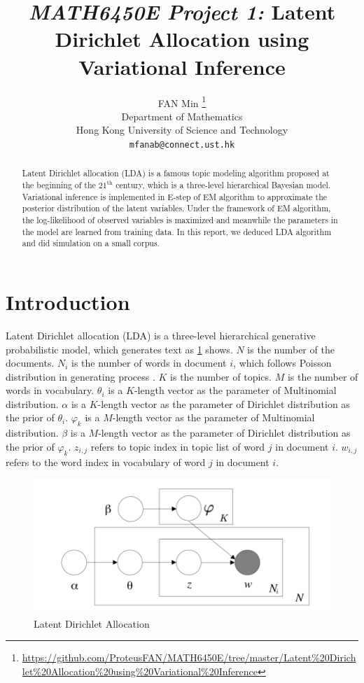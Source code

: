 \documentclass{article}
\title{\emph{MATH6450E Project 1:} Latent Dirichlet Allocation using Variational Inference}
\author{%
  FAN Min
  \thanks{\url{https://github.com/ProteusFAN/MATH6450E/tree/master/Latent\%20Dirichlet\%20Allocation\%20using\%20Variational\%20Inference}} \\
  Department of Mathematics\\
  Hong Kong University of Science and Technology\\
  \texttt{mfanab@connect.ust.hk} \\
}
\begin{document}

\maketitle

\begin{abstract}
   Latent Dirichlet allocation (LDA) is a famous topic modeling algorithm proposed at the beginning of the $ 21^{\mathrm{th}} $ century, which is a three-level hierarchical Bayesian model. Variational inference is implemented in E-step of EM algorithm to approximate the posterior distribution of the latent variables. Under the framework of EM algorithm, the log-likelihood of observed variables is maximized and meanwhile the parameters in the model are learned from training data. In this report, we deduced LDA algorithm and did simulation on a small corpus. 
\end{abstract}

\section{Introduction}

Latent Dirichlet allocation (LDA) is a three-level hierarchical generative probabilistic model, which generates text as \ref{figure_lda} shows. $ N $ is the number of the documents. $ N_{i} $ is the number of words in document $ i $, which follows Poisson distribution in generating process . $ K $ is the number of topics. $ M $ is the number of words in vocabulary. $ \theta_{i} $ is a $ K $-length vector as the parameter of Multinomial distribution. $ \alpha $ is a $ K $-length vector as the parameter of Dirichlet distribution as the prior of $ \theta_{i} $. $ \varphi_{k} $ is a $ M $-length vector as the parameter of Multinomial distribution. $ \beta $ is a $ M $-length vector as the parameter of Dirichlet distribution as the prior of $ \varphi_{k} $. $ z_{i,j} $ refers to topic index in topic list of word $ j $ in document $ i $. $ w_{i,j} $ refers to the word index in vocabulary of word $ j $ in document $ i $.

\begin{figure}[htbp]
	\centering
	\includegraphics[width = 0.7\linewidth]{lda}
	\caption{Latent Dirichlet Allocation}
	\label{figure_lda}
\end{figure}
\end{document}
